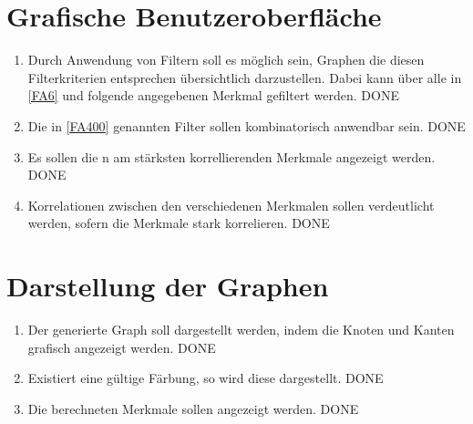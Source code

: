 \documentclass[13pt]{scrreprt}
\newcounter{tempcounter1}
\newcounter{tempcounter2}
\newcounter{tempcounter3}
\newcounter{tempcounter4}
\newcounter{tempcounter5}
\newcounter{tempcounter6}
\newcounter{tempcounter7}
\newcounter{tempcounter8}
\newcounter{tempcounter9}
\begin{document}
\section{Grafische Benutzeroberfläche}
\begin{addmargin}[25pt]{0pt}
	\begin{enumerate} [label=FA\arabic*,start=400]
		\item \label{FA400}Durch Anwendung von Filtern soll es möglich sein, Graphen die diesen Filterkriterien entsprechen übersichtlich darzustellen. Dabei kann über alle in \ref{FA6} und folgende angegebenen Merkmal gefiltert werden. DONE
		\item \label{FA401}Die in \ref{FA400} genannten Filter sollen kombinatorisch anwendbar sein. DONE
		\item Es sollen die n am stärksten korrellierenden Merkmale angezeigt werden. DONE
		\item Korrelationen zwischen den verschiedenen Merkmalen sollen verdeutlicht werden, sofern die Merkmale stark korrelieren. DONE
		\setcounter{tempcounter6}{\value{enumi}}
	\end{enumerate}
\end{addmargin}

\section{Darstellung der Graphen}
\begin{addmargin}[25pt]{0pt}
	\begin{enumerate} [label=FA\arabic*,start=500]
		\item \label{FA500}Der generierte Graph soll dargestellt werden, indem die Knoten und Kanten grafisch angezeigt werden. DONE
		\item Existiert eine gültige Färbung, so wird diese dargestellt. DONE
		\item Die berechneten Merkmale sollen angezeigt werden. DONE
		\setcounter{tempcounter7}{\value{enumi}}
	\end{enumerate}
\end{addmargin}
\end{document}

